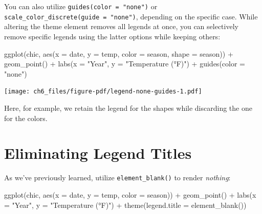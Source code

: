 \documentclass[
  letterpaper,
  DIV=11,
  numbers=noendperiod]{scrreprt}
\newenvironment{Shaded}{\begin{snugshade}}{\end{snugshade}}
\newcommand{\AttributeTok}[1]{\textcolor[rgb]{0.40,0.45,0.13}{#1}}
\newcommand{\FunctionTok}[1]{\textcolor[rgb]{0.28,0.35,0.67}{#1}}
\newcommand{\NormalTok}[1]{\textcolor[rgb]{0.00,0.23,0.31}{#1}}
\newcommand{\SpecialCharTok}[1]{\textcolor[rgb]{0.37,0.37,0.37}{#1}}
\newcommand{\StringTok}[1]{\textcolor[rgb]{0.13,0.47,0.30}{#1}}
\begin{document}
You can also utilize \texttt{guides(color\ =\ "none")} or
\texttt{scale\_color\_discrete(guide\ =\ "none")}, depending on the
specific case. While altering the theme element removes all legends at
once, you can selectively remove specific legends using the latter
options while keeping others:

\begin{Shaded}
\begin{Highlighting}[]
\FunctionTok{ggplot}\NormalTok{(chic,}
       \FunctionTok{aes}\NormalTok{(}\AttributeTok{x =}\NormalTok{ date, }\AttributeTok{y =}\NormalTok{ temp,}
           \AttributeTok{color =}\NormalTok{ season, }\AttributeTok{shape =}\NormalTok{ season)) }\SpecialCharTok{+}
  \FunctionTok{geom\_point}\NormalTok{() }\SpecialCharTok{+}
  \FunctionTok{labs}\NormalTok{(}\AttributeTok{x =} \StringTok{"Year"}\NormalTok{, }\AttributeTok{y =} \StringTok{"Temperature (°F)"}\NormalTok{) }\SpecialCharTok{+}
  \FunctionTok{guides}\NormalTok{(}\AttributeTok{color =} \StringTok{"none"}\NormalTok{)}
\end{Highlighting}
\end{Shaded}

\texttt{[image: ch6\_files/figure-pdf/legend-none-guides-1.pdf]}

Here, for example, we retain the legend for the shapes while discarding
the one for the colors.

\section{Eliminating Legend Titles}\label{eliminating-legend-titles}

As we've previously learned, utilize \texttt{element\_blank()} to render
\emph{nothing}:

\begin{Shaded}
\begin{Highlighting}[]
\FunctionTok{ggplot}\NormalTok{(chic, }\FunctionTok{aes}\NormalTok{(}\AttributeTok{x =}\NormalTok{ date, }\AttributeTok{y =}\NormalTok{ temp, }\AttributeTok{color =}\NormalTok{ season)) }\SpecialCharTok{+}
  \FunctionTok{geom\_point}\NormalTok{() }\SpecialCharTok{+}
  \FunctionTok{labs}\NormalTok{(}\AttributeTok{x =} \StringTok{"Year"}\NormalTok{, }\AttributeTok{y =} \StringTok{"Temperature (°F)"}\NormalTok{) }\SpecialCharTok{+}
  \FunctionTok{theme}\NormalTok{(}\AttributeTok{legend.title =} \FunctionTok{element\_blank}\NormalTok{())}
\end{Highlighting}
\end{Shaded}
\end{document}

